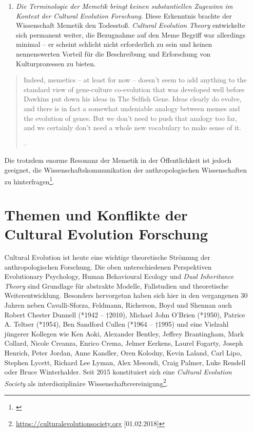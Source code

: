 \documentclass[openany,twoside,twocolumn]{book}
\providecommand{\tightlist}{%
  \setlength{\itemsep}{0pt}\setlength{\parskip}{0pt}}
\let\rmarkdownfootnote\footnote%
\def\footnote{\protect\rmarkdownfootnote}
\begin{document}
\begin{enumerate}
\def\labelenumi{\arabic{enumi}.}
\setcounter{enumi}{2}
\tightlist
\item
  \emph{Die Terminologie der Memetik bringt keinen substantiellen Zugewinn im Kontext der Cultural Evolution Forschung.} Diese Erkenntnis brachte der Wissenschaft Memetik den Todesstoß. \emph{Cultural Evolution Theory} entwickelte sich permanent weiter, die Bezugnahme auf den Meme Begriff war allerdings minimal -- er scheint schlicht nicht erforderlich zu sein und keinen nennenswerten Vorteil für die Beschreibung und Erforschung von Kulturprozessen zu bieten.
\end{enumerate}

\begin{quote}
Indeed, memetics -- at least for now -- doesn't seem to add anything to the standard view of gene-culture co-evolution that was developed well before Dawkins put down his ideas in The Selfish Gene. Ideas clearly do evolve, and there is in fact a somewhat undeniable analogy between memes and the evolution of genes. But we don't need to push that analogy too far, and we certainly don't need a whole new vocabulary to make sense of it.

-- \textcite{pigliucci_trouble_2007}
\end{quote}

Die trotzdem enorme Resonanz der Memetik in der Öffentlichkeit ist jedoch geeignet, die Wissenschaftskommunikation der anthropologischen Wissenschaften zu hinterfragen\footnote{\textcite{bloch_where_2005}}.

\hypertarget{themen-und-konflikte-der-cultural-evolution-forschung}{%
\section{Themen und Konflikte der Cultural Evolution Forschung}\label{themen-und-konflikte-der-cultural-evolution-forschung}}

Cultural Evolution ist heute eine wichtige theoretische Strömung der anthropologischen Forschung. Die oben unterschiedenen Perspektiven Evolutionary Psychology, Human Behavioural Ecology und \emph{Dual Inheritance Theory} sind Grundlage für abstrakte Modelle, Fallstudien und theoretische Weiterentwicklung. Besonders hervorgetan haben sich hier in den vergangenen 30 Jahren neben Cavalli-Sforza, Feldmann, Richerson, Boyd und Shennan auch Robert Chester Dunnell (*1942 -- †2010), Michael John O'Brien (*1950), Patrice A. Teltser (*1954), Ben Sandford Cullen (*1964 -- †1995) und eine Vielzahl jüngerer Kollegen wie Ken Aoki, Alexander Bentley, Jeffrey Brantingham, Mark Collard, Nicole Creanza, Enrico Crema, Jelmer Eerkens, Laurel Fogarty, Joseph Henrich, Peter Jordan, Anne Kandler, Oren Kolodny, Kevin Laland, Carl Lipo, Stephen Lycett, Richard Lee Lyman, Alex Mesoudi, Craig Palmer, Luke Rendell oder Bruce Winterhalder. Seit 2015 konstituiert sich eine \emph{Cultural Evolution Society} als interdisziplinäre Wissenschaftsvereinigung\footnote{\url{https://culturalevolutionsociety.org} {[}01.02.2018{]}}.
\end{document}
